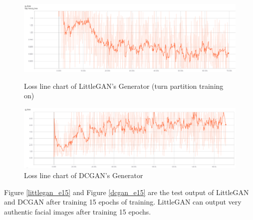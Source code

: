 \begin{figure}
    \begin{minipage}[t]{0.49\linewidth}
        \centering
        \includegraphics[width=\textwidth]{figures/loss_part_on_g.png}
        \caption{Loss line chart of LittleGAN's Generator (turn partition training on)}
        \label{loss_part_on_g}
    \end{minipage}
        \hfill
    \begin{minipage}[t]{0.49\linewidth}
        \centering
        \includegraphics[width=\textwidth]{figures/loss_dcgan_g.png}
        \caption{Loss line chart of DCGAN's Generator}
        \label{loss_dcgan_g}
    \end{minipage}
\end{figure}

Figure \ref{littlegan_e15} and Figure \ref{dcgan_e15} are the test output of LittleGAN and DCGAN after training 15 epochs of training.
LittleGAN can output very authentic facial images after training 15 epochs.

